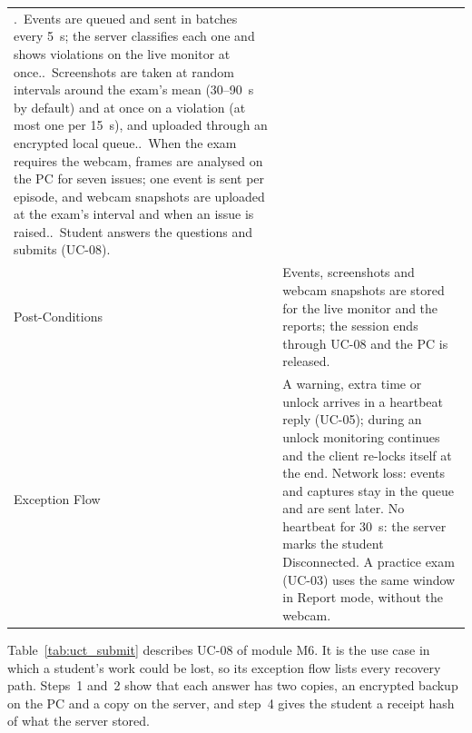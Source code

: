{\begin{longtable}{>{\small\raggedright\arraybackslash}p{3.3cm}>{\small\raggedright\arraybackslash}p{\dimexpr\textwidth-3.3cm-4\tabcolsep\relax}}
4.~Events are queued and sent in batches every 5~s; the server classifies each one and shows violations on the live monitor at once.\newline
5.~Screenshots are taken at random intervals around the exam's mean (30--90~s by default) and at once on a violation (at most one per 15~s), and uploaded through an encrypted local queue.\newline
6.~When the exam requires the webcam, frames are analysed on the PC for seven issues; one event is sent per episode, and webcam snapshots are uploaded at the exam's interval and when an issue is raised.\newline
7.~Student answers the questions and submits (UC-08). \\
Post-Conditions & Events, screenshots and webcam snapshots are stored for the live monitor and the reports; the session ends through UC-08 and the PC is released. \\
Exception Flow & A warning, extra time or unlock arrives in a heartbeat reply (UC-05); during an unlock monitoring continues and the client re-locks itself at the end. Network loss: events and captures stay in the queue and are sent later. No heartbeat for 30~s: the server marks the student Disconnected. A practice exam (UC-03) uses the same window in Report mode, without the webcam. \\
\end{longtable}}

Table~\ref{tab:uct_submit} describes UC-08 of module M6. It is the use case in which a student's work could be lost, so its exception flow lists every recovery path. Steps~1 and~2 show that each answer has two copies, an encrypted backup on the PC and a copy on the server, and step~4 gives the student a receipt hash of what the server stored.

